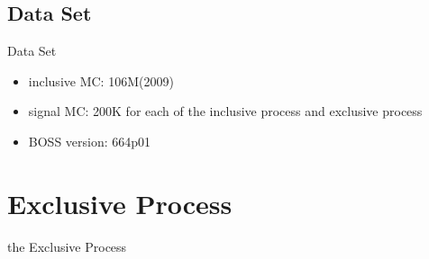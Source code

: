 \documentclass{beamer}
\begin{document}
\subsection{Data Set}
\begin{frame}{Data Set}
\begin{itemize}
\item inclusive MC:     106M(2009)
\item signal MC:        200K for each of the inclusive process and exclusive process
\item BOSS version:     664p01
\end{itemize}
\end{frame}

\section{Exclusive Process}
\begin{frame}
\begin{block}{}
\begin{center}
\bigskip
\huge{the Exclusive Process}
\bigskip
\end{center}
\end{block}
\end{frame}
\end{document}
